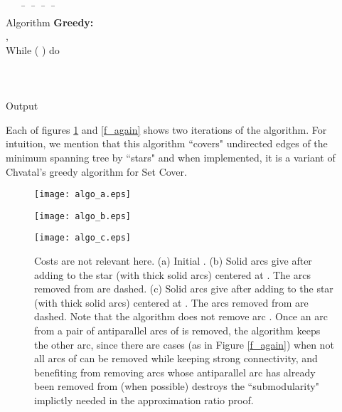 \documentclass[12pt]{article}
\begin{document}
\begin{tabbing}
\ \ \ \= \ \ \= \ \ \= \  \ \= \ \ \  \\
Algorithm {\bf Greedy:} \\
\> ,  \\
\> While ( ) do\\
\> \>  \\
\> \>  \\
\> \>  \\
\> Output 
\end{tabbing}

\bigskip

Each of figures \ref{f_algo} and \ref{f_again} shows
 two iterations of the algorithm.
For intuition, we mention that this algorithm ``covers" undirected 
edges of the minimum spanning tree
by ``stars" and when implemented, it is a variant of
Chvatal's \cite{Chvatal79} greedy algorithm for Set Cover.
 

\begin{figure}[ht]
\begin{minipage}[b]{0.3\linewidth}
\centering
\texttt{[image: algo\_a.eps]}
\end{minipage}
\begin{minipage}[b]{0.3\linewidth}
\centering
\texttt{[image: algo\_b.eps]}
\end{minipage}
\begin{minipage}[b]{0.3\linewidth}
\centering
\texttt{[image: algo\_c.eps]}
\end{minipage}
\caption{
Costs are not relevant here.  (a) Initial .  (b) Solid arcs give 
 after adding to 
 the star  (with thick solid arcs) centered at .
The arcs removed from  are dashed.
(c) Solid arcs give 
 after adding 
to  the star  (with thick solid arcs) centered at .
The arcs removed from  are dashed.
Note that the algorithm does not remove arc .
Once an arc from a pair of antiparallel arcs of  
is removed, the algorithm keeps the other arc, since
there are cases (as in Figure \ref{f_again})
 when not all arcs of  can be removed
while keeping strong connectivity, and benefiting from
removing arcs whose antiparallel arc has already been removed from 
(when possible)
destroys the ``submodularity" implictly 
needed in the approximation ratio proof.
}\label{f_algo}
\end{figure}
\end{document}
